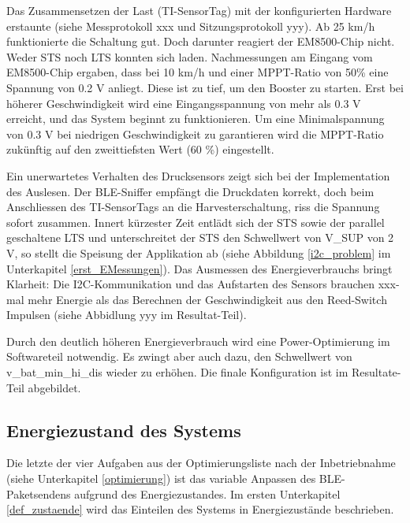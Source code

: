 
Das Zusammensetzen der Last (TI-SensorTag) mit der konfigurierten Hardware erstaunte (siehe Messprotokoll xxx und Sitzungsprotokoll yyy). Ab 25 km/h funktionierte die Schaltung gut. Doch darunter reagiert der EM8500-Chip nicht. Weder STS noch LTS konnten sich laden. Nachmessungen am Eingang vom EM8500-Chip ergaben, dass bei  10 km/h und einer MPPT-Ratio von 50\thinspace\% eine Spannung von 0.2 V anliegt. Diese ist zu tief, um den Booster zu starten. Erst bei höherer Geschwindigkeit wird eine Eingangsspannung von mehr als 0.3 V erreicht, und das System beginnt zu funktionieren. Um eine Minimalspannung von 0.3 V bei niedrigen Geschwindigkeit zu garantieren wird die MPPT-Ratio zukünftig auf den zweittiefsten Wert (60 \thinspace\%) eingestellt.

Ein unerwartetes Verhalten des Drucksensors zeigt sich bei der Implementation des Auslesen. Der BLE-Sniffer empfängt die Druckdaten korrekt, doch beim Anschliessen des TI-SensorTags an die Harvesterschaltung, riss die Spannung sofort zusammen. Innert kürzester Zeit entlädt sich der STS sowie der parallel geschaltene LTS und unterschreitet der STS den Schwellwert von V\_SUP von 2 V, so stellt die Speisung der Applikation ab (siehe Abbildung \ref{i2c_problem} im Unterkapitel \ref{erst_EMessungen}). Das Ausmessen des Energieverbrauchs bringt Klarheit: Die I2C-Kommunikation und das Aufstarten des Sensors brauchen xxx-mal mehr Energie als das Berechnen der Geschwindigkeit aus den Reed-Switch Impulsen (siehe Abbidlung yyy im Resultat-Teil).


Durch den deutlich höheren Energieverbrauch wird eine Power-Optimierung im Softwareteil notwendig. Es zwingt aber auch dazu, den Schwellwert von v\_bat\_min\_hi\_dis  wieder zu erhöhen. Die finale Konfiguration ist im Resultate-Teil abgebildet.


\subsection{Energiezustand des Systems}
\label{v_energiezustand}

Die letzte der vier Aufgaben aus der Optimierungsliste nach der Inbetriebnahme (siehe Unterkapitel \ref{optimierung}) ist das variable Anpassen des BLE-Paketsendens aufgrund des Energiezustandes. Im ersten Unterkapitel \ref{def_zustaende} wird das Einteilen des Systems in Energiezustände beschrieben. %

